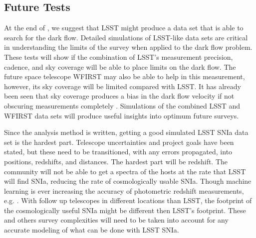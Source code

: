 \documentclass[apj, iop]{emulateapj}
\newcommand{\sn}{SNIa}
\newcommand{\todo}[1]{\textbf{\textcolor{red}{#1}}}
\newcommand{\lcdm}{$\Lambda$CDM}     %
\begin{document}
\subsection{Future Tests}\label{future-tests}

At the end of \cite{Mathews16}, we suggest that LSST might produce a data set
that is able to search for the dark flow. Detailed simulations of LSST-like data
sets are critical in understanding the limits of the survey when applied to the
dark flow problem.  These tests will show if the combination of LSST's
measurement precision, cadence, and sky coverage will be able to place limits on
the dark flow.
The future space telescope WFIRST may also be able to help in this measurement,
however, its sky coverage will be limited compared with LSST. It has already
been seen that sky coverage produces a bias in the dark flow velocity
\citep{Appleby14} if not obscuring measurements completely \citep{Mathews16}.
Simulations of the combined LSST and WFIRST data sets will produce useful
insights into optimum future surveys.

Since the analysis method is written, getting a good simulated LSST \sn{} data
set is the hardest part. Telescope uncertainties and project goals have been
stated, but these need to be transitioned, with any errors propagated, into
positions, redshifts, and distances. The hardest part will be redshift. The
community will not be able to get a spectra of the hosts at the rate that LSST
will find \sn, reducing the rate of cosmologically usable \sn. Though machine
learning is ever increasing the accuracy of photometric redshift measurements,
e.g. \cite{Kind13}. With follow up telescopes in different locations than
LSST, the footprint of the cosmologically useful \sn{} might be different then
LSST's footprint. These and others survey complexities will need to be taken
into account for any accurate modeling of what can be done with LSST \sn{}.
\end{document}

